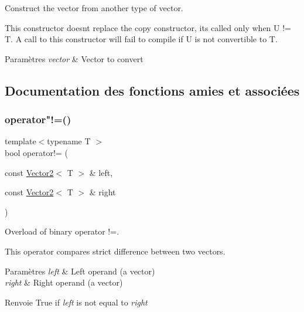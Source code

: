 Construct the vector from another type of vector. 

This constructor doesn\textquotesingle{}t replace the copy constructor, it\textquotesingle{}s called only when U != T. A call to this constructor will fail to compile if U is not convertible to T.


\begin{DoxyParams}{Paramètres}
{\em vector} & Vector to convert \\
\hline
\end{DoxyParams}


\subsection{Documentation des fonctions amies et associées}
\mbox{\label{classsf_1_1Vector2_a01673da35ef9c52d0e54b8263549a956}} 
\subsubsection{\texorpdfstring{operator"!=()}{operator!=()}}
{\footnotesize\ttfamily template$<$typename T $>$ \\
bool operator!= (\begin{DoxyParamCaption}\item[{const \hyperlink{classsf_1_1Vector2}{Vector2}$<$ T $>$ \&}]{left,  }\item[{const \hyperlink{classsf_1_1Vector2}{Vector2}$<$ T $>$ \&}]{right }\end{DoxyParamCaption})\hspace{0.3cm}{\ttfamily [related]}}



Overload of binary operator !=. 

This operator compares strict difference between two vectors.


\begin{DoxyParams}{Paramètres}
{\em left} & Left operand (a vector) \\
\hline
{\em right} & Right operand (a vector)\\
\hline
\end{DoxyParams}
\begin{DoxyReturn}{Renvoie}
True if {\itshape left} is not equal to {\itshape right} 
\end{DoxyReturn}
\mbox{\label{classsf_1_1Vector2_a5f48ca928995b41c89f155afe8d16b02}} 
